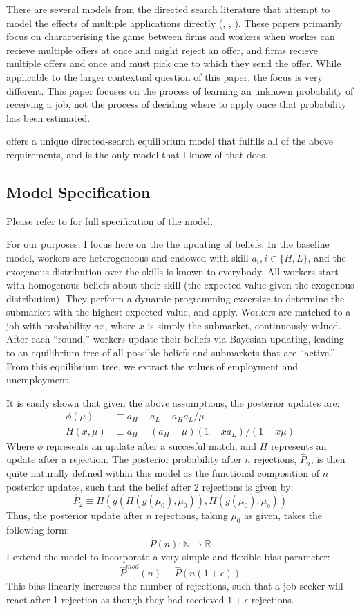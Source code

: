 \documentclass[a4paper,12pt]{article}
\begin{document}
There are several models from the directed search literature that attempt to model the effects of multiple applications directly (\cite{albrecht2006}, \cite{galenianos2009}, \cite{wolthoff2017}). These papers primarily focus on characterising the game between firms and workers when workes can recieve multiple offers at once and might reject an offer, and firms recieve multiple offers and once and must pick one to which they send the offer. While applicable to the larger contextual question of this paper, the focus is very different. This paper focuses on the process of learning an unknown probability of receiving a job, not the process of deciding where to apply once that probability has been estimated. 

\cite{gonzalez2010} offers a unique directed-search equilibrium model that fulfills all of the above requirements, and is the only model that I know of that does. 

\subsection{ Model Specification }

Please refer to \cite{gonzalez2010} for full specification of the model. 

For our purposes, I focus here on the the updating of beliefs. In the baseline model, workers are heterogeneous and endowed with skill $a_i, i \in \{ H, L \}$, and the exogenous distribution over the skills is known to everybody. All workers start with homogenous beliefs about their skill (the expected value given the exogenous distribution). They perform a dynamic programming excersize to determine the submarket with the highest expected value, and apply. Workers are matched to a job with probability $ax$, where $x$ is simply the submarket, continuously valued. After each ``round,'' workers update their beliefs via Bayesian updating, leading to an equilibrium tree of all possible beliefs and submarkets that are ``active.'' From this equilibrium tree, we extract the values of employment and unemployment.

It is easily shown that given the above assumptions, the posterior updates are:
%
\begin{align*}
  \phi(\mu) &\equiv  a_H + a_L - a_Ha_L/\mu \\
  H(x, \mu) &\equiv a_H - (a_H - \mu)(1 - xa_L)/(1 - x\mu)
\end{align*}
%
Where $\phi$ represents an update after a succesful match, and $H$ represents an update after a rejection. The posterior probability after $n$ rejections, $\hat{P}_n$, is then quite naturally defined within this model as the functional composition of $n$ posterior updates, such that the belief after 2 rejections is given by: 
$$
\hat{P}_2 \equiv H(g(H(g(\mu_0), \mu_0)), H(g(\mu_0),\mu_o))
$$
Thus, the posterior update after $n$ rejections, taking $\mu_0$ as given, takes the following form:  
%
$$
\hat{P}(n): \mathbb{N} \rightarrow \mathbb{R}
$$
%
I extend the model to incorporate a very simple and flexible bias parameter: 
%
$$
\hat{P}^{mod}(n) \equiv \hat{P} (n(1 + \epsilon))
$$
This bias linearly increases the number of rejections, such that a job seeker will react after 1 rejection as though they had receieved $1 + \epsilon$ rejections.
\end{document}
